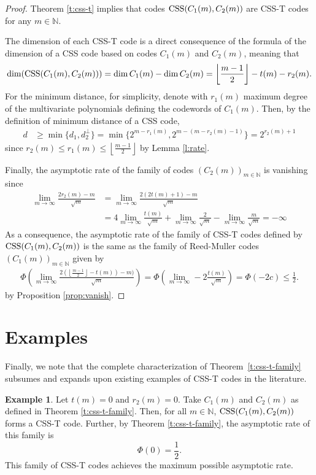 \documentclass{amsart}
\theoremstyle{definition}
\newtheorem{example}{Example}
\newcommand{\N}{{\mathbb{N}}}
\newcommand{\floor}[1]{\left\lfloor#1\right\rfloor}
\newcommand{\CSS}{\textnormal{CSS}}
\begin{document}
\begin{proof}
Theorem \ref{t:css-t} implies that  codes $\CSS(C_1(m),C_2(m))$ are CSS-T codes for any $m\in \N$.

The dimension of each CSS-T code is a direct consequence of the formula of the dimension of a CSS code based on codes $C_1(m)$ and $C_2(m)$, meaning that
\[\dim(\CSS(C_1(m),C_2(m)))=\dim C_1(m)-\dim C_2(m)=\floor{\frac{m-1}{2}} - t(m)-r_2(m).\]
For the minimum distance, for simplicity, denote with $r_1(m)$ maximum degree of the multivariate polynomials defining the codewords of $C_1(m)$. Then, by the definition of minimum distance of a CSS code, 
\begin{align*}
    d&\geq \min\{d_1, d_2^\perp\}=\min \{2^{m-r_1(m)},2^{m-(m-r_2(m)-1)}\}=2^{r_2(m)+1}
\end{align*}
since $r_2(m)\leq r_1(m)\leq \floor{ \frac{m-1}2}$ by Lemma \ref{l:rate}.

Finally, the asymptotic rate of the family of codes $(C_2(m))_{m\in \N}$ is vanishing since 
\begin{align*}
    \lim_{m \to \infty} \frac{2r_2(m) - m}{\sqrt{m}}&=\lim_{m \to \infty}\frac{2(2t(m)+1) - m}{\sqrt{m}}\\
    &= 4\lim_{m \to \infty}\frac{t(m)}{\sqrt{m}} +\lim_{m \to \infty}\frac{2}{\sqrt{m}}-\lim_{m \to \infty} \frac{m}{\sqrt{m}}=-\infty
\end{align*}
As a consequence, the asymptotic rate of the family of CSS-T codes defined by $\CSS(C_1(m), C_2(m))$ is the same as the family of Reed-Muller codes $(C_1(m))_{m\in \N}$ given by
\begin{align*}
    \Phi\left(\lim_{m \to \infty} \frac{2\left(\floor{\frac{m-1}{2}}-t(m)\right)-m)}{\sqrt{m}}\right) = \Phi\left(\lim_{m \to \infty} -2\frac{t(m)}{\sqrt{m}}\right)=\Phi(-2c)\leq \frac{1}{2}.
\end{align*}
by Proposition \ref{prop:vanish}.\end{proof}
\section{Examples}\label{s:examples}
Finally, we note that the complete characterization of Theorem~\ref{t:css-t-family} subsumes and expands upon existing examples of CSS-T codes in the literature. 

\begin{example}  %
Let $t(m) = 0$ and $r_2(m) = 0$. Take $C_1(m)$ and $C_2(m)$ as defined in Theorem \ref{t:css-t-family}. Then, for all $m\in\N$, $\CSS(C_1(m), C_2(m))$ forms a CSS-T code. Further, by Theorem \ref{t:css-t-family}, the asymptotic rate of this family is 
\[ \Phi(0) = \frac{1}{2}. \]
This family of CSS-T codes achieves the maximum possible asymptotic rate.
\end{example}
\end{document}

